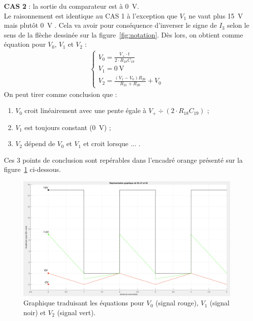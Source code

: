 \documentclass[10pt, oneside, a4paper]{article}
\begin{document}
\newpage
\noindent\textbf{CAS 2} : la sortie du comparateur est à \SI{0}{\volt}. \\
Le raisonnement est identique au CAS 1 à l'exception que $V_1$ ne vaut plus \SI{15}{\volt} mais plutôt \SI{0}{\volt} .
Cela va avoir pour conséquence d'inverser le signe de $I_3$ selon le sens de la flèche dessinée sur la figure~\ref{fig:notation}.
Dès lors, on obtient comme équation pour $V_0$, $V_1$ et $V_2$ :
\begin{gather}
    \begin{cases}
        V_0 = \frac{V_+ \cdot t}{2 \cdot R_{18}C_{19}} \\
        V_1 = \SI{0}{\volt} \\
        V_{2} = \frac{(V_1 - V_0) R_{20}}{R_{21}+R_{20}} + V_0
    \end{cases}
\end{gather}
On peut tirer comme conclusion que :
\begin{enumerate}
\item $V_0$ croit linéairement avec une pente égale à $V_+ \div \left(2 \cdot R_{18} C_{19}\right)$ ;
\item $V_1$ est toujours constant (\SI{0}{\volt}) ;
\item $V_2$ dépend de $V_0$ et $V_1$ et croit lorsque ... .
\end{enumerate}
Ces 3 points de conclusion sont repérables dans l'encadré orange présenté sur la figure~\ref{fig:Graphe_Sigma_Delta}                ci-dessous. \\


\begin{figure}[!ht]
    \centering
    \includegraphics[width=\textwidth]{image/Sigma_Delta_Graphe.png}
    \caption{Graphique traduisant les équations pour $V_0$ (signal rouge), $V_1$ (signal noir) et $V_2$ (signal vert).}
    \label{fig:Graphe_Sigma_Delta}
\end{figure}
\newpage
\end{document}
